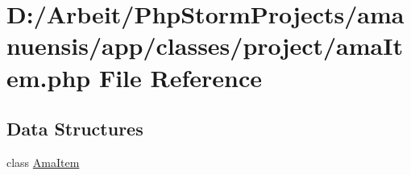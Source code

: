 \hypertarget{a00098}{}\section{D\+:/\+Arbeit/\+Php\+Storm\+Projects/amanuensis/app/classes/project/ama\+Item.php File Reference}
\label{a00098}
\subsection*{Data Structures}
\begin{DoxyCompactItemize}
\item 
class \hyperlink{a00004}{Ama\+Item}
\end{DoxyCompactItemize}

